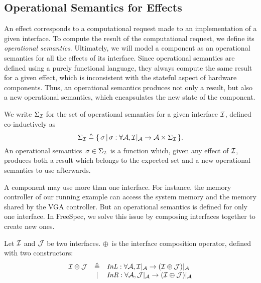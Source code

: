 \subsection{Operational Semantics for Effects}

An effect corresponds to a computational request made to an implementation of a
given interface.
%
To compute the result of the computational request, we define its
\emph{operational semantics}.
%
Ultimately, we will model a component as an operational semantics for all the
effects of its interface.
%
Since operational semantics are defined using a purely functional language, they
always compute the same result for a given effect, which is inconsistent with
the stateful aspect of hardware components.
%
Thus, an operational semantics produces not only a result, but also a new
operational semantics, which encapsulates the new state of the component.

\begin{definition}
  We write $\Sigma_{\mathcal{I}}$ for the set of operational semantics for a given
  interface $\mathcal{I}$, defined co-inductively as
  \[
    \Sigma_{\mathcal{I}} \triangleq \{\,\sigma\,|\,\sigma : \forall \mathcal{A},
    \mathcal{I}|_{\mathcal{A}} \rightarrow \mathcal{A} \times \Sigma_{\mathcal{I}} \,\}.
  \]
  An operational semantics~$\sigma \in \Sigma_{\mathcal{I}}$ is a function which, given
  any effect of $\mathcal{I}$, produces both a result which belongs to the expected set
  and a new operational semantics to use afterwards.
\end{definition}

A component may use more than one interface.
%
For instance, the memory controller of our running example can access the system
memory and the memory shared by the VGA controller.
%
But an operational semantics is defined for only one interface.
%
In FreeSpec, we solve this issue by composing interfaces together to create new
ones.

\begin{definition}
  Let $\mathcal{I}$ and $\mathcal{J}$ be two interfaces. $\oplus$~is the interface composition
  operator, defined with two constructors:
  \[
    \begin{array}{rcl}
      \mathcal{I} \oplus \mathcal{J}
      & \triangleq
      & \mathit{InL} : \forall \mathcal{A},
        \mathcal{I}|_{\mathcal{A}} \rightarrow
        (\mathcal{I} \oplus \mathcal{J})|_{\mathcal{A}} \\

      & |
      & \mathit{InR} : \forall \mathcal{A}, \mathcal{J}|_{\mathcal{A}}
        \rightarrow (\mathcal{I} \oplus \mathcal{J})|_{\mathcal{A}}
    \end{array}
  \]
\end{definition}

